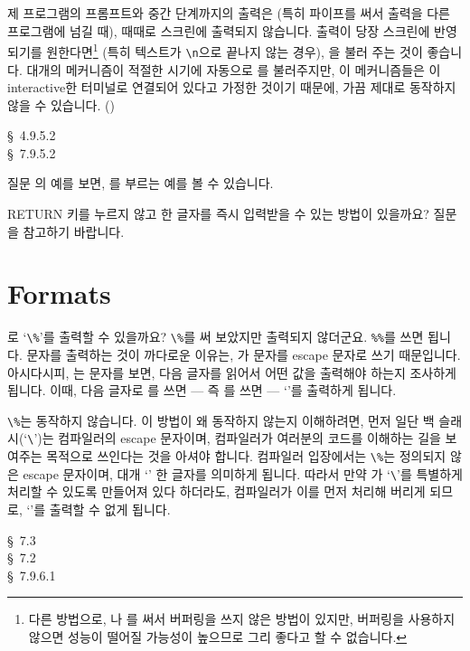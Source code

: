 \begin{faq}
	제 프로그램의 프롬프트와 중간 단계까지의 출력은 (특히 파이프를 써서
	출력을 다른 프로그램에 넘길 때), 때때로 스크린에 출력되지 않습니다.
\A
	출력이 당장 스크린에 반영되기를 원한다면\footnote{다른 방법으로,
	나 를 써서 버퍼링을 쓰지 않은 방법이
	있지만, 버퍼링을 사용하지 않으면 성능이 떨어질 가능성이 높으므로
	그리 좋다고 할 수 없습니다.}
	(특히 텍스트가 \verb+\n+으로
	끝나지 않는 경우), 을 불러 주는 것이 좋습니다.
	대개의 메커니즘이 적절한 시기에 자동으로 를 불러주지만,
	이 메커니즘들은 이 interactive한 터미널로 연결되어 있다고
        가정한 것이기 때문에, 가끔
	제대로 동작하지 않을 수 있습니다.  ()

\R
	\cite{ansi} \S\ 4.9.5.2 \\
	\cite{c89} \S\ 7.9.5.2

\T
	질문 의 예를 보면,
        를 부르는 예를 볼 수 있습니다.
\end{faq}


\begin{faq}
	RETURN 키를 누르지 않고 한 글자를 즉시 입력받을 수 있는 방법이
	있을까요?
\A
	질문 을 참고하기 바랍니다.
\end{faq}


\section{ Formats}	\label{sec:printf}

\begin{faq}
	로 `\verb+\%+'를 출력할 수 있을까요? \verb+\%+를
        써 보았지만 출력되지 않더군요.
\A
	\verb+%%+를 쓰면 됩니다.
	\TT{\%} 문자를 출력하는 것이 까다로운 이유는, 가 
	\TT{\%} 문자를 escape 문자로 쓰기 때문입니다.  아시다시피,
	는 \TT{\%} 문자를 보면, 다음 글자를 읽어서 어떤
	값을 출력해야 하는지 조사하게 됩니다.  이때, 다음 글자로
	\TT{\%}를 쓰면 --- 즉 \TT{\%\%}를 쓰면 --- `\TT{\%}'를 출력하게
	됩니다.
	
	\verb+\%+는 동작하지 않습니다.  이 방법이 왜 동작하지 않는지
	이해하려면, 먼저 일단 백 슬래시(`\verb+\+')는 컴파일러의 escape 
	문자이며,  컴파일러가 여러분의 코드를 이해하는 길을 보여주는
	목적으로 쓰인다는 것을 아셔야 합니다.  컴파일러 입장에서는
	\verb+\%+는 정의되지 않은 escape 문자이며, 대개 `\TT{\%}' 한 글자를
	의미하게 됩니다.  따라서 만약 가 `\verb+\+'를 특별하게
	처리할 수 있도록 만들어져 있다 하더라도, 컴파일러가 이를 먼저
	처리해 버리게 되므로, `\TT{\%}'를 출력할 수 없게 됩니다.


\R
	\cite{kr1} \S\ 7.3  \\
	\cite{kr2} \S\ 7.2  \\
	\cite{c89} \S\ 7.9.6.1
\end{faq}

